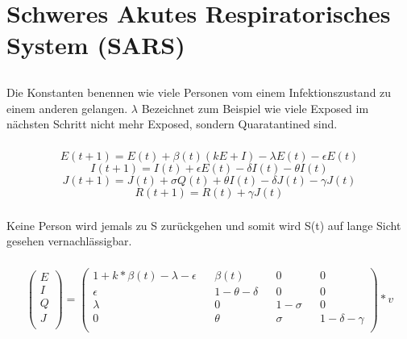 \documentclass{article}
\begin{document}
\vspace{5mm}
\section{Schweres Akutes Respiratorisches System (SARS)}
\subsection{}

\subsubsection{}
Die Konstanten benennen wie viele Personen vom einem Infektionszustand zu einem anderen gelangen.
$\lambda$ Bezeichnet zum Beispiel wie viele Exposed im nächsten Schritt nicht mehr Exposed, sondern Quaratantined sind.

\subsubsection{}
$$E(t+1) = E(t) + \beta(t)(kE+I) - \lambda E(t) - \epsilon E(t) $$
$$I(t+1) = I(t) + \epsilon E(t) - \delta I(t) - \theta I(t)$$
$$J(t+1) = J(t) + \sigma Q(t) + \theta I(t) - \delta J(t) - \gamma J(t)$$
$$R(t+1) = R(t) + \gamma J(t)$$

\subsubsection{}
Keine Person wird jemals zu S zurückgehen und somit wird S(t) auf lange Sicht gesehen vernachlässigbar.

\subsubsection{}
\[
    \begin{pmatrix}
    E \\
    I \\
    Q \\
    J \\
    \end{pmatrix}
    =
    \begin{pmatrix}
     1 + k * \beta (t) - \lambda - \epsilon && \beta (t) && 0 && 0\\
     \epsilon &&  1 - \theta - \delta && 0 && 0\\
     \lambda && 0 && 1 - \sigma && 0 \\
     0 &&  \theta && \sigma && 1 - \delta - \gamma \\
    \end{pmatrix}
    * v
\]
\end{document}
